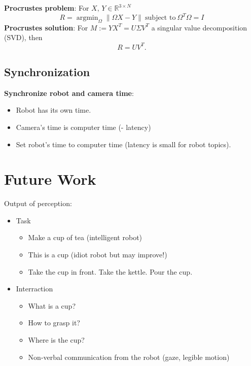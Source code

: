 \documentclass{beamer}
\DeclareMathOperator*{\argmin}{argmin}
\begin{document}
\begin{frame}
\textbf{Procrustes problem}: \newline
For $X,\, Y \in \mathbb{R}^{3 \times N}$
\begin{equation}
R = \argmin_{\Omega} \| \Omega X -Y \|~\text{subject to}~ \Omega^T\Omega = I
\end{equation}
\textbf{Procrustes solution}: \newline
For $M := Y X^T = U \Sigma V^T$ a singular value decomposition (SVD), then
\begin{equation}
R = U V^T .
\end{equation}
\end{frame}

\subsection{Synchronization}

\begin{frame}
\textbf{Synchronize robot and camera time}:
\begin{itemize}
\item Robot has its own time.
\item Camera's time is computer time (- latency)
\item Set robot's time to computer time (latency is small for robot topics).
\end{itemize}
\end{frame}

\section{Future Work}
\begin{frame}
Output of perception:
\begin{itemize}
\item Task
\begin{itemize}
\item Make a cup of tea (intelligent robot)
\item This is a cup (idiot robot but may improve!)
\item Take the cup in front. Take the kettle. Pour the cup.
\end{itemize}
\item Interraction
\begin{itemize}
\item What is a cup?
\item How to grasp it?
\item Where is the cup?
\item Non-verbal communication from the robot (gaze, legible motion)
\end{itemize}
\end{itemize}
\end{frame}
\end{document}
